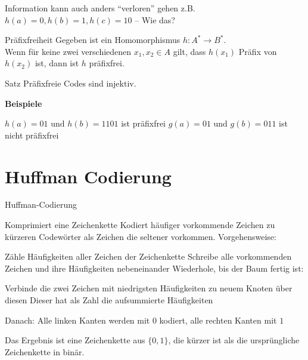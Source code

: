 \documentclass[handout]{beamer}
\begin{document}
\begin{frame}
\begin{itemize}
\pitem Information kann auch anders ``verloren'' gehen
\pitem[$\rightarrow$] z.B. $h(a) = 0, h(b) = 1, h(c) = 10$ \p -- Wie das?
\end{itemize} \pause
\begin{block}{Präfixfreiheit}
\p Gegeben ist ein Homomorphismus $h: A^* \rightarrow B^*$.\\
\p Wenn für keine zwei verschiedenen $x_1, x_2 \in A$ gilt\p , dass $h(x_1)$  Präfix von $h(x_2)$ ist\p , dann ist $h$ präfixfrei. 
\end{block}
\pause
\begin{block}{Satz}
Präfixfreie Codes sind injektiv.
\end{block} \pause
\textbf{Beispiele}\\
\begin{itemize}
\pitem $h(a) = 01 \text{ und } h(b) = 1101 $ ist präfixfrei
\pitem $g(a) = 01 \text{ und } g(b) = 011$ ist nicht präfixfrei
\end{itemize}
\end{frame}

\section{Huffman Codierung}

\begin{frame}{Huffman-Codierung}
\begin{itemize}
\pitem Komprimiert eine Zeichenkette
\pitem Kodiert häufiger vorkommende Zeichen zu kürzeren Codewörter als Zeichen die seltener vorkommen.
\pitem Vorgehensweise:
\begin{enumerate}
\pitem Zähle Häufigkeiten aller Zeichen der Zeichenkette
\pitem Schreibe alle vorkommenden Zeichen und ihre Häufigkeiten nebeneinander
\pitem Wiederhole, bis der Baum fertig ist:
\begin{itemize}
\pitem Verbinde die zwei Zeichen mit niedrigsten Häufigkeiten zu neuem Knoten über diesen
\pitem Dieser hat als Zahl die aufsummierte Häufigkeiten
\end{itemize}
\pitem Danach: Alle linken Kanten werden mit $0$ kodiert, alle rechten Kanten mit $1$
\end{enumerate}
\end{itemize}

\p Das Ergebnis ist eine Zeichenkette aus $\{0,1\}$\p , die kürzer ist als die ursprüngliche Zeichenkette in binär.
\end{frame}
\end{document}

